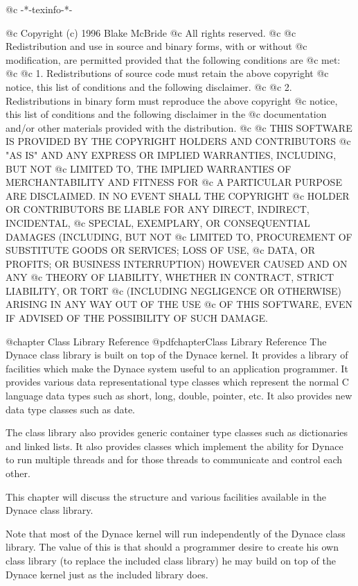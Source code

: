 @c -*-texinfo-*-

@c  Copyright (c) 1996 Blake McBride
@c  All rights reserved.
@c
@c  Redistribution and use in source and binary forms, with or without
@c  modification, are permitted provided that the following conditions are
@c  met:
@c
@c  1. Redistributions of source code must retain the above copyright
@c  notice, this list of conditions and the following disclaimer.
@c
@c  2. Redistributions in binary form must reproduce the above copyright
@c  notice, this list of conditions and the following disclaimer in the
@c  documentation and/or other materials provided with the distribution.
@c
@c  THIS SOFTWARE IS PROVIDED BY THE COPYRIGHT HOLDERS AND CONTRIBUTORS
@c  "AS IS" AND ANY EXPRESS OR IMPLIED WARRANTIES, INCLUDING, BUT NOT
@c  LIMITED TO, THE IMPLIED WARRANTIES OF MERCHANTABILITY AND FITNESS FOR
@c  A PARTICULAR PURPOSE ARE DISCLAIMED. IN NO EVENT SHALL THE COPYRIGHT
@c  HOLDER OR CONTRIBUTORS BE LIABLE FOR ANY DIRECT, INDIRECT, INCIDENTAL,
@c  SPECIAL, EXEMPLARY, OR CONSEQUENTIAL DAMAGES (INCLUDING, BUT NOT
@c  LIMITED TO, PROCUREMENT OF SUBSTITUTE GOODS OR SERVICES; LOSS OF USE,
@c  DATA, OR PROFITS; OR BUSINESS INTERRUPTION) HOWEVER CAUSED AND ON ANY
@c  THEORY OF LIABILITY, WHETHER IN CONTRACT, STRICT LIABILITY, OR TORT
@c  (INCLUDING NEGLIGENCE OR OTHERWISE) ARISING IN ANY WAY OUT OF THE USE
@c  OF THIS SOFTWARE, EVEN IF ADVISED OF THE POSSIBILITY OF SUCH DAMAGE.

@chapter Class Library Reference
@pdfchapter{Class Library Reference}
The Dynace class library is built on top of the Dynace kernel.  It
provides a library of facilities which make the Dynace system useful to
an application programmer.  It provides various data representational
type classes which represent the normal C language data types such as
short, long, double, pointer, etc.  It also provides new data type
classes such as date.

The class library also provides generic container type classes such as
dictionaries and linked lists.  It also provides classes which implement
the ability for Dynace to run multiple threads and for those threads to
communicate and control each other.

This chapter will discuss the structure and various facilities available in
the Dynace class library.

Note that most of the Dynace kernel will run independently of the Dynace class
library.  The value of this is that should a programmer desire to create
his own class library (to replace the included class library) he may
build on top of the Dynace kernel just as the included library does.

